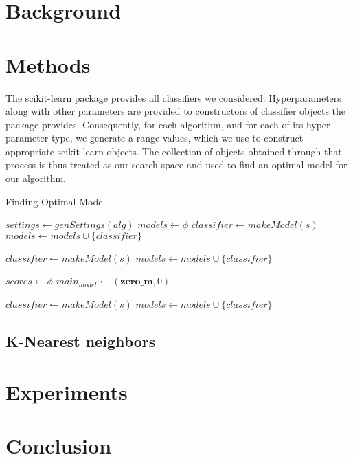 \documentclass{cup-ino}
\begin{document}
\section{Background}

\section{Methods}
The scikit-learn package provides all classifiers we considered. Hyperparameters along with other parameters are provided to constructors of classifier objects the package provides. Consequently, for each algorithm, and for each of its hyper-parameter type, we generate a range values, which we use to construct appropriate scikit-learn objects. The collection of objects obtained through that process is thus treated as our search space and used to find an optimal model for our algorithm.

\begin{algorithm}
  \caption{Finding Optimal Model}\label{euclid}
  \begin{algorithmic}[1]
      \State $settings\gets genSettings(alg)$
      \State $models \gets \phi $
        \State $classifier \gets  makeModel(s)$
        \State $models \gets models \cup \{ classifier \}$
      \EndFor
      
        \State $classifier \gets  makeModel(s)$
        \State $models \gets models \cup \{ classifier \}$
      \EndFor
      
      \State $scores \gets \phi$
      \State $main_{model} \gets (\textbf{zero_{m}}, 0)$
      
        \State $classifier \gets  makeModel(s)$
        \State $models \gets models \cup \{ classifier \}$
      \EndFor
      
      
    \EndProcedure
  \end{algorithmic}
\end{algorithm}

\subsection{K-Nearest neighbors}

\section{Experiments}

\section{Conclusion}
\end{document}

